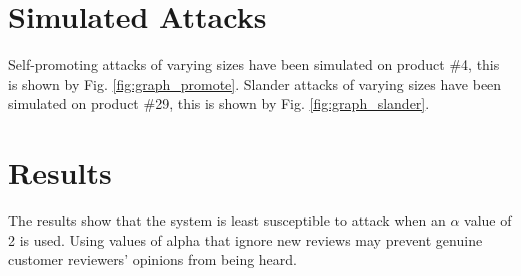\documentclass{article}
\begin{document}
\section{Simulated Attacks} %
Self-promoting attacks of varying sizes have been simulated on product \#4, this is shown by Fig. \ref{fig:graph_promote}.
Slander attacks of varying sizes have been simulated on product \#29, this is shown by Fig. \ref{fig:graph_slander}.

\section{Results}
The results show that the system is least susceptible to attack when an $\alpha$ value of 2 is used.
Using values of alpha that ignore new reviews may prevent genuine customer reviewers' opinions from being heard.

\newpage
\raggedright
{}

\newpage
\end{document}
